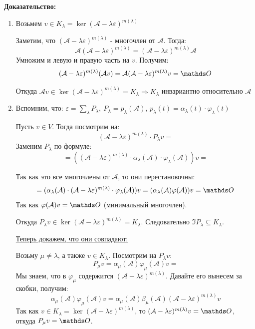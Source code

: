 \textbf{Доказательство:}
\begin{enumerate}
    \item Возьмем $v \in K_{\lambda} = \ker(\mathcal{A} - \lambda \varepsilon)^{m(\lambda)} $

    Заметим, что $(\mathcal{A} - \lambda \varepsilon)^{m(\lambda)}$  - многочлен от $\mathcal{A}$. Тогда:
    $$\mathcal{A}(\mathcal{A} - \lambda \varepsilon)^{m(\lambda)} = (\mathcal{A} - \lambda \varepsilon)^{m(\lambda)} \mathcal{A}$$
    Умножим и левую и правую часть на $v$. Получим:
    $$(\mathcal{A} - \lambda \varepsilon)^{m(\lambda)}(\mathcal{A}v)=\mathcal{A}(\mathcal{A} -\lambda \varepsilon)^{m(\lambda)}v = \zero$$


    Откуда $ \mathcal{A} v \in \ker(\mathcal{A} -\lambda \varepsilon)^{m(\lambda)} = K _{\lambda} \Rightarrow K_{\lambda} $ инвариантно относительно $\mathcal{A}$

    \item Вспомним, что: $\varepsilon = \sum\limits_{\lambda}P_{\lambda}, \ P_{\lambda }= p_{\lambda}(\mathcal{A})$, $p_{\lambda}(t)=\alpha_{\lambda}(t) \cdot \varphi_{\lambda}(t)$
   
    Пусть $v \in V$. Тогда посмотрим на:
     $$( \mathcal{A}-\lambda \varepsilon)^{m(\lambda)} \cdot P_{\lambda}v = $$
    Заменим $P_{\lambda}$ по формуле:
    $$= ((\mathcal{A} -\lambda \varepsilon)^{m(\lambda)} \cdot \alpha_{\lambda}(\mathcal{A})\cdot \varphi_{\lambda}(\mathcal{A}))v =$$

    Так как это все многочлены от $\mathcal{A}$, то они перестановочны:
    $$ = (\alpha_{\lambda}(\mathcal{A})\cdot (\mathcal{A}-\lambda \varepsilon)^{m(\lambda)} \cdot \varphi_{\lambda}(\mathcal{A}))v = (\alpha_{\lambda}(\mathcal{A})\varphi(\mathcal{A}))v= \zero$$
    Так как $\varphi(\mathcal{A}) v = \zero$ (минимальный многочлен).
    


    Откуда $ P_{\lambda}v \in \ker (\mathcal{A}-\lambda \varepsilon)^{m(\lambda)} = K_{\lambda}$. Следовательно $ \Im P_{\lambda} \subseteq K_{\lambda}$.

    
    
    \uline{Теперь докажем, что они совпадают:}
    
    Возьму $\mu \ne \lambda$, а также $v \in K_{\lambda}$.  Посмотрим на $P_{\lambda}v$:
$$P_{\mu}v= \alpha_{\mu}(\mathcal{A})\varphi_{\mu}(\mathcal{A})v =$$
 Мы знаем, что в $\varphi_\mu$ содержится $(\mathcal{A}-\lambda\varepsilon)^{m(\lambda)}$. Давайте его вынесем за скобки, получим:
 $$\alpha_{\mu}(\mathcal{A})\varphi_{\mu}(\mathcal{A})v =\alpha_{\mu}(\mathcal{A})\beta_{\mu}(\mathcal{A})(\mathcal{A} -\lambda \varepsilon)^{m(\lambda)}v$$
 Так как $v \in K_{\lambda} = \ker (\mathcal{A}-\lambda \varepsilon)^{m(\lambda)}$, то $ (\mathcal{A}-\lambda \varepsilon)^{m(\lambda)}v = \zero$, откуда $P_{\mu}v = \zero$.


\end{enumerate}
